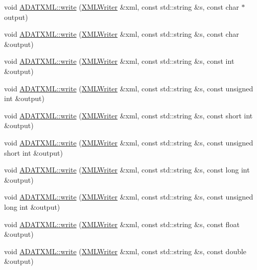 \begin{DoxyCompactItemize}
\item 
void \mbox{\hyperlink{group__io_gafaebe3bd91fd5654568bc862bded8d3d}{A\+D\+A\+T\+X\+M\+L\+::write}} (\mbox{\hyperlink{classADATXML_1_1XMLWriter}{X\+M\+L\+Writer}} \&xml, const std\+::string \&s, const char $\ast$output)
\item 
void \mbox{\hyperlink{group__io_ga397db53ca185f22405c43c5b5f6e6a8d}{A\+D\+A\+T\+X\+M\+L\+::write}} (\mbox{\hyperlink{classADATXML_1_1XMLWriter}{X\+M\+L\+Writer}} \&xml, const std\+::string \&s, const char \&output)
\item 
void \mbox{\hyperlink{group__io_gadc4b57f737a20fc500619ce19834df8e}{A\+D\+A\+T\+X\+M\+L\+::write}} (\mbox{\hyperlink{classADATXML_1_1XMLWriter}{X\+M\+L\+Writer}} \&xml, const std\+::string \&s, const int \&output)
\item 
void \mbox{\hyperlink{group__io_ga5856cc9bbcc04728d4c4c248085478d6}{A\+D\+A\+T\+X\+M\+L\+::write}} (\mbox{\hyperlink{classADATXML_1_1XMLWriter}{X\+M\+L\+Writer}} \&xml, const std\+::string \&s, const unsigned int \&output)
\item 
void \mbox{\hyperlink{group__io_ga0576b7ad74a4cc939c5fd164dddd2ac9}{A\+D\+A\+T\+X\+M\+L\+::write}} (\mbox{\hyperlink{classADATXML_1_1XMLWriter}{X\+M\+L\+Writer}} \&xml, const std\+::string \&s, const short int \&output)
\item 
void \mbox{\hyperlink{group__io_gabe7167254a6bfbd7e4d5046e1758e48f}{A\+D\+A\+T\+X\+M\+L\+::write}} (\mbox{\hyperlink{classADATXML_1_1XMLWriter}{X\+M\+L\+Writer}} \&xml, const std\+::string \&s, const unsigned short int \&output)
\item 
void \mbox{\hyperlink{group__io_gae6391d5ecac6e646e20a7cc2dd67ffbd}{A\+D\+A\+T\+X\+M\+L\+::write}} (\mbox{\hyperlink{classADATXML_1_1XMLWriter}{X\+M\+L\+Writer}} \&xml, const std\+::string \&s, const long int \&output)
\item 
void \mbox{\hyperlink{group__io_gaca56f1bd58c3916a9c9ca8f0041b9c21}{A\+D\+A\+T\+X\+M\+L\+::write}} (\mbox{\hyperlink{classADATXML_1_1XMLWriter}{X\+M\+L\+Writer}} \&xml, const std\+::string \&s, const unsigned long int \&output)
\item 
void \mbox{\hyperlink{group__io_ga004a6551422be9e3a46d53e5e974acfd}{A\+D\+A\+T\+X\+M\+L\+::write}} (\mbox{\hyperlink{classADATXML_1_1XMLWriter}{X\+M\+L\+Writer}} \&xml, const std\+::string \&s, const float \&output)
\item 
void \mbox{\hyperlink{group__io_gae1439bc15e3d4497d18ecc77d6443d3b}{A\+D\+A\+T\+X\+M\+L\+::write}} (\mbox{\hyperlink{classADATXML_1_1XMLWriter}{X\+M\+L\+Writer}} \&xml, const std\+::string \&s, const double \&output)

\end{DoxyCompactItemize}
